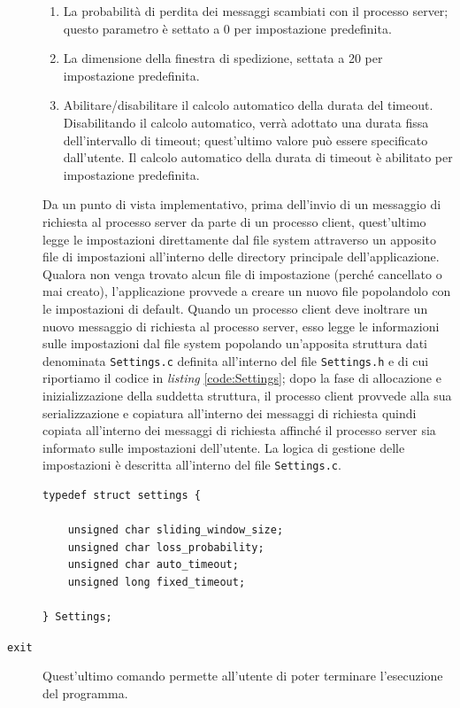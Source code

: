 \documentclass[10pt,a4paper, titlepage]{report}
\begin{document}
\begin{description}
\begin{enumerate}
\item La probabilità di perdita dei messaggi scambiati con il processo server; questo parametro è settato a 0 per impostazione predefinita.
\item La dimensione della finestra di spedizione, settata a 20 per impostazione predefinita.
\item Abilitare/disabilitare il calcolo automatico della durata del timeout. Disabilitando il calcolo automatico, verrà adottato una durata fissa dell'intervallo di timeout; quest'ultimo valore può essere specificato dall'utente. Il calcolo automatico della durata di timeout è abilitato per impostazione predefinita.
\end{enumerate}

Da un punto di vista implementativo, prima dell'invio di un messaggio di richiesta al processo server da parte di un processo client, quest'ultimo legge le impostazioni direttamente dal file system attraverso un apposito file di impostazioni all'interno delle directory principale dell'applicazione. Qualora non venga trovato alcun file di impostazione (perché cancellato o mai creato), l'applicazione provvede a creare un nuovo file popolandolo con le impostazioni di default. 
Quando un processo client deve inoltrare un nuovo messaggio di richiesta al processo server, esso legge le informazioni sulle impostazioni dal file system popolando un'apposita struttura dati denominata \texttt{Settings.c} definita all'interno del file \texttt{Settings.h} e di cui riportiamo il codice in \textit{listing} \ref{code:Settings}; dopo la fase di allocazione e inizializzazione della suddetta struttura, il processo client provvede alla sua serializzazione e copiatura all'interno dei messaggi di richiesta  quindi copiata all'interno dei messaggi di richiesta affinché il processo server sia informato sulle impostazioni dell'utente. La logica di gestione delle impostazioni è descritta all'interno del file \texttt{Settings.c}.

\begin{lstlisting}[frame=lines, caption={Implementazione della struttura \texttt{Settings}}, label={code:Settings}]
typedef struct settings {

	unsigned char sliding_window_size;
	unsigned char loss_probability;
	unsigned char auto_timeout;
	unsigned long fixed_timeout;

} Settings;
\end{lstlisting}
\item[\texttt{exit}] Quest'ultimo comando permette all'utente di poter terminare l'esecuzione del programma.
\end{description}
\end{document}
